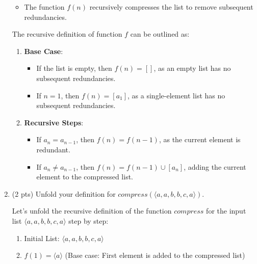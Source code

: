 \documentclass[12pt]{article}
\begin{document}
\begin{spacing}{1.5}
\begin{enumerate}
\begin{itemize}
		      	\item The function $f(n)$ recursively compresses the list to remove subsequent redundancies.
		      \end{itemize}
		      		      
		      The recursive definition of function $f$ can be outlined as: 
		      		      
		      \begin{enumerate}
		      	\item \textbf{Base Case}: 
		      	      \begin{itemize}
		      	      	\item If the list is empty, then $f(n) = []$, as an empty list has no subsequent redundancies.
		      	      	      		      	      	                          
		      	      	\item If $n = 1$, then $f(n) = [a_1]$, as a single-element list has no subsequent redundancies.
		      	      \end{itemize}
		      	      		      	      
		      	\item \textbf{Recursive Steps}:
		      	      \begin{itemize}
		      	      	\item If $a_n = a_{n-1}$, then $f(n) = f(n-1)$, as the current element is redundant.
		      	      	      		      	      	      
		      	      	\item If $a_n \neq a_{n-1}$, then $f(n) = f(n-1) \cup [a_n]$, adding the current element to the compressed list.
		      	      \end{itemize}
		      \end{enumerate}
		      		      
		\item (2 pts) Unfold your definition for $compress(\langle a, a, b, b, c, a \rangle)$.
		      		      
		      Let's unfold the recursive definition of the function $compress$ for the input list $\langle a, a, b, b, c, a \rangle$ step by step:
		      		      
		      \begin{enumerate}
		      	\item Initial List: $\langle a, a, b, b, c, a \rangle$
		      	      		      	      
		      	\item $f(1) = \langle a \rangle$ (Base case: First element is added to the compressed list)
		      	      		      	      

\end{enumerate}
\end{enumerate}
\end{spacing}
\end{document}
